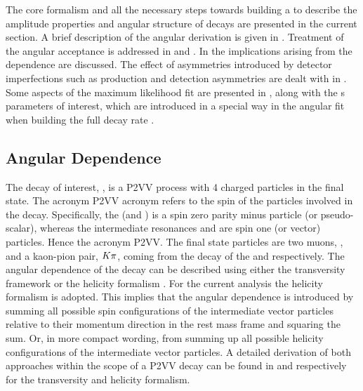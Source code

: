 
The core formalism and all the necessary steps towards building a \pdf to describe the amplitude properties and angular structure of \BJpsiKst decays are presented in
the current section. A brief description of the angular \pdf derivation is given in .
Treatment of the angular acceptance is addressed in  and .
In  the implications arising from the \mkpi dependence are discussed.
The effect of asymmetries introduced by detector imperfections such as production and detection asymmetries are dealt with
in . Some aspects of the maximum likelihood fit are presented in ,
along with the \Acp{} parameters of interest, which are introduced in a special way in the angular fit when building the full decay rate \pdf.


\subsection{Angular Dependence}
\label{Diferential_Decay_Rate}

The decay of interest, \BsJpsiKst, is a P2VV process with 4 charged particles in the final state.
The acronym P2VV acronym refers to the spin of the particles involved in the decay.
Specifically, the \Bs (and \Bd) is a spin zero parity minus particle (or pseudo-scalar), whereas the intermediate resonances
\jpsi and \Kstarzb are spin one (or vector) particles. Hence the acronym P2VV. The final state particles are
two muons, \mmu, and a kaon-pion pair, $K\pi$, coming from the decay of the \jpsi and \Kstarzb respectively.
The angular dependence of the \BsJpsiKst decay can be described using either the transversity framework \cite{transvFrameworkI,transvFrameworkII}
or the helicity formalism \cite{helicityFormI,helicityFormII}. For the current analysis the helicity
formalism is adopted. This implies that the angular dependence is introduced by summing all possible
spin configurations of the intermediate vector particles relative to their momentum direction in the
\Bs rest mass frame and squaring the sum. Or, in more compact wording, from summing up all possible
helicity configurations of the intermediate vector particles. A detailed derivation of both approaches
within the scope of a P2VV decay can be found in \cite{daanThesis} and \cite{jeroenThesis} respectively
for the transversity and helicity formalism.

